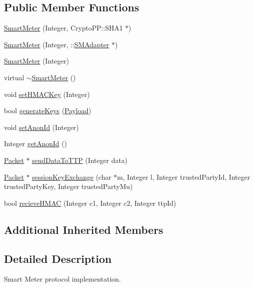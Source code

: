 \subsection*{Public Member Functions}
\begin{DoxyCompactItemize}
\item 
\hyperlink{classSMImp_1_1SmartMeter_ac677ae1800bcd36e4d599cf3e65463b4}{Smart\+Meter} (Integer, Crypto\+P\+P\+::\+S\+H\+A1 $\ast$)
\item 
\hyperlink{classSMImp_1_1SmartMeter_acadde39bc15942aae2dceb2b4c8c654f}{Smart\+Meter} (Integer, \+::\hyperlink{classSMAdapter}{S\+M\+Adapter} $\ast$)
\item 
\hyperlink{classSMImp_1_1SmartMeter_ae4e756ce74055472a69a0b93f7fd0810}{Smart\+Meter} (Integer)
\item 
virtual \hyperlink{classSMImp_1_1SmartMeter_ace2ebf8736cf495f30a2bc55b1706d73}{$\sim$\+Smart\+Meter} ()
\item 
void \hyperlink{classSMImp_1_1SmartMeter_a577ec9d3df97e40c63e15f3d2f1847af}{set\+H\+M\+A\+C\+Key} (Integer)
\item 
bool \hyperlink{classSMImp_1_1SmartMeter_a38dcb0b09d01582e1322c11638d98fbf}{generate\+Keys} (\hyperlink{structSMImp_1_1Payload}{Payload})
\item 
void \hyperlink{classSMImp_1_1SmartMeter_a4ac0d17fe970851c693d75efc4483094}{set\+Anon\+Id} (Integer)
\item 
Integer \hyperlink{classSMImp_1_1SmartMeter_ad8721f6b2058318e7acf1ce6afa0757d}{get\+Anon\+Id} ()
\item 
\hyperlink{structSMImp_1_1Packet}{Packet} $\ast$ \hyperlink{classSMImp_1_1SmartMeter_ab5248e75260fdd693fe0f5bb3238c249}{send\+Data\+To\+T\+TP} (Integer data)
\item 
\hyperlink{structSMImp_1_1Packet}{Packet} $\ast$ \hyperlink{classSMImp_1_1SmartMeter_a9511926a038ac3ac9c65013f7dd7fb2f}{session\+Key\+Exchange} (char $\ast$m, Integer l, Integer trusted\+Party\+Id, Integer trusted\+Party\+Key, Integer trusted\+Party\+Mu)
\item 
bool \hyperlink{classSMImp_1_1SmartMeter_a489f430377277201d687642d9a58ab80}{recieve\+H\+M\+AC} (Integer c1, Integer c2, Integer ttp\+Id)
\end{DoxyCompactItemize}
\subsection*{Additional Inherited Members}


\subsection{Detailed Description}
Smart Meter protocol implementation. 

